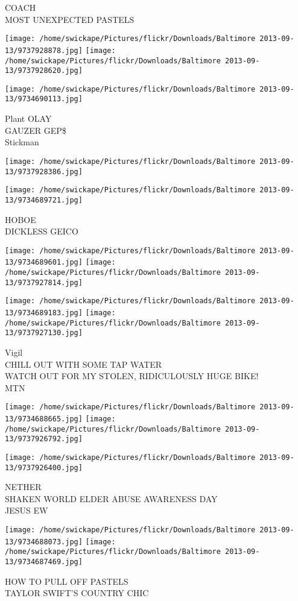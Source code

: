 \documentclass[10pt,letterpaper]{article}
\begin{document}
COACH\\
MOST UNEXPECTED PASTELS
\pagebreak

\texttt{[image: /home/swickape/Pictures/flickr/Downloads/Baltimore 2013-09-13/9737928878.jpg]}
\texttt{[image: /home/swickape/Pictures/flickr/Downloads/Baltimore 2013-09-13/9737928620.jpg]}

\texttt{[image: /home/swickape/Pictures/flickr/Downloads/Baltimore 2013-09-13/9734690113.jpg]}

Plant OLAY\\
GAUZER GEP\$\\
Stickman
\pagebreak

\texttt{[image: /home/swickape/Pictures/flickr/Downloads/Baltimore 2013-09-13/9737928386.jpg]}

\vspace{0.25in}
\texttt{[image: /home/swickape/Pictures/flickr/Downloads/Baltimore 2013-09-13/9734689721.jpg]}

HOBOE\\
DICKLESS GEICO
\pagebreak

\texttt{[image: /home/swickape/Pictures/flickr/Downloads/Baltimore 2013-09-13/9734689601.jpg]}
\texttt{[image: /home/swickape/Pictures/flickr/Downloads/Baltimore 2013-09-13/9737927814.jpg]}

\texttt{[image: /home/swickape/Pictures/flickr/Downloads/Baltimore 2013-09-13/9734689183.jpg]}
\texttt{[image: /home/swickape/Pictures/flickr/Downloads/Baltimore 2013-09-13/9737927130.jpg]}

Vigil\\
CHILL OUT WITH SOME TAP WATER\\
WATCH OUT FOR MY STOLEN, RIDICULOUSLY HUGE BIKE!\\
MTN
\pagebreak

\texttt{[image: /home/swickape/Pictures/flickr/Downloads/Baltimore 2013-09-13/9734688665.jpg]}
\texttt{[image: /home/swickape/Pictures/flickr/Downloads/Baltimore 2013-09-13/9737926792.jpg]}

\vspace{0.25in}
\texttt{[image: /home/swickape/Pictures/flickr/Downloads/Baltimore 2013-09-13/9737926400.jpg]}

NETHER\\
SHAKEN WORLD ELDER ABUSE AWARENESS DAY\\
JESUS EW
\pagebreak

\texttt{[image: /home/swickape/Pictures/flickr/Downloads/Baltimore 2013-09-13/9734688073.jpg]}
\texttt{[image: /home/swickape/Pictures/flickr/Downloads/Baltimore 2013-09-13/9734687469.jpg]}

HOW TO PULL OFF PASTELS\\
TAYLOR SWIFT'S COUNTRY CHIC
\pagebreak
\end{document}
